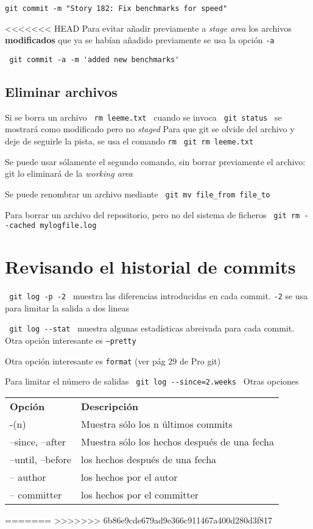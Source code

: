 \documentclass[]{article}
\begin{document}
\verb=git commit -m "Story 182: Fix benchmarks for speed"=

<<<<<<< HEAD
Para evitar añadir previamente a \textit{stage area} los archivos \textbf{modificados} que ya se habían añadido previamente  se usa la opción \texttt{-a} 

\verb= git commit -a -m 'added new benchmarks' =

\subsection*{Eliminar archivos}

Si se borra un archivo \verb= rm leeme.txt = cuando se invoca \verb= git status = se mostrará como modificado pero no \textit{staged} Para que git se olvide del archivo y deje de seguirle la pista, se usa el comando \texttt{rm} \verb= git rm leeme.txt = 

Se puede usar sólamente el segundo comando, sin borrar previamente el archivo: git lo eliminará de la \textit{working area}

Se puede renombrar un archivo mediante \verb= git mv file_from file_to =

Para borrar un archivo del repositorio, pero no del sistema de ficheros \verb= git rm --cached mylogfile.log =

\section{Revisando el historial de commits}

\verb= git log -p -2 = muestra las diferencias introducidas en cada commit. \texttt{-2} se usa para limitar la salida a dos lineas

\verb= git log --stat = muestra algunas estadísticas abreivada para cada commit. Otra opción interesante es \texttt{--pretty}

Otra opción interesante es \texttt{format} (ver pág 29 de Pro git)

Para limitar el número de salidas \verb+ git log --since=2.weeks + Otras opciones

\begin{tabular}{ll}
	\textbf{Opción} & \textbf{Descripción}\\
	-(n) & Muestra sólo los n últimos commits\\
	--since, --after & Muestra sólo los hechos después de una fecha\\
	--until, --before & los hechos después de una fecha\\
	-- author & los hechos por el autor\\
	-- committer & los hechos por el committer\\
\end{tabular}

=======
>>>>>>> 6b86e9cde679ad9e366c911467a400d280d3f817
\end{document}

